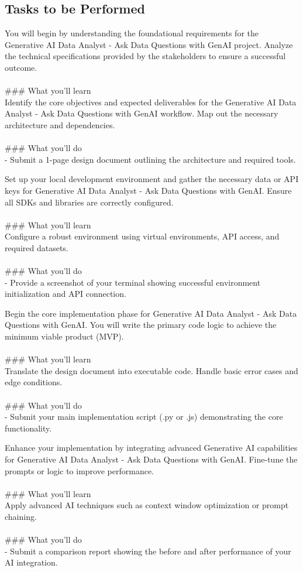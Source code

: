 \documentclass{article}
\begin{document}
\subsection*{Tasks to be Performed}
You will begin by understanding the foundational requirements for the Generative AI Data Analyst - Ask Data Questions with GenAI project. Analyze the technical specifications provided by the stakeholders to ensure a successful outcome. \\
 \\
### What you'll learn \\
Identify the core objectives and expected deliverables for the Generative AI Data Analyst - Ask Data Questions with GenAI workflow. Map out the necessary architecture and dependencies. \\
 \\
### What you'll do \\
- Submit a 1-page design document outlining the architecture and required tools.

Set up your local development environment and gather the necessary data or API keys for Generative AI Data Analyst - Ask Data Questions with GenAI. Ensure all SDKs and libraries are correctly configured. \\
 \\
### What you'll learn \\
Configure a robust environment using virtual environments, API access, and required datasets. \\
 \\
### What you'll do \\
- Provide a screenshot of your terminal showing successful environment initialization and API connection.

Begin the core implementation phase for Generative AI Data Analyst - Ask Data Questions with GenAI. You will write the primary code logic to achieve the minimum viable product (MVP). \\
 \\
### What you'll learn \\
Translate the design document into executable code. Handle basic error cases and edge conditions. \\
 \\
### What you'll do \\
- Submit your main implementation script (.py or .js) demonstrating the core functionality.

Enhance your implementation by integrating advanced Generative AI capabilities for Generative AI Data Analyst - Ask Data Questions with GenAI. Fine-tune the prompts or logic to improve performance. \\
 \\
### What you'll learn \\
Apply advanced AI techniques such as context window optimization or prompt chaining. \\
 \\
### What you'll do \\
- Submit a comparison report showing the before and after performance of your AI integration.
\end{document}
